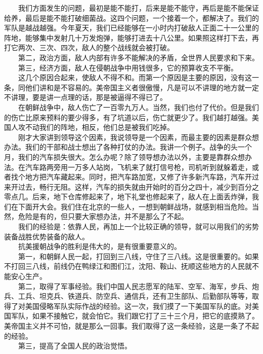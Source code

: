 \documentclass[cn,11pt,chinese]{elegantbook}
\begin{document}
　　我们方面发生的问题，最初是能不能打，后来是能不能守，再后是能不能保证给养，最后是能不能打破细菌战。这四个问题，一个接着一个，都解决了。我们的军队是越战越强。今年夏天，我们已经能够在一小时内打破敌人正面二十一公里的阵地，能够集中发射几十万发炮弹，能够打进去十八公里。如果照这样打下去，再打它两次、三次、四次，敌人的整个战线就会被打破。\\
　　第二，政治方面，敌人内部有许多不能解决的矛盾，全世界人民要求和下来。\\
　　第三，经济方面，敌人在侵朝战争中用钱很多，它的预算收支不平衡。\\
　　这几个原因合起来，使敌人不得不和。而第一个原因是主要的原因，没有这一条，同他们讲和是不容易的。美帝国主义者很傲慢，凡是可以不讲理的地方就一定不讲理，要是讲一点理的话，那是被逼得不得已了。\\
　　在朝鲜战争中，敌人伤亡了一百零九万人。当然，我们也付了代价。但是我们的伤亡比原来预料的要少得多，有了坑道以后，伤亡就更少了。我们越打越强。美国人攻不动我们的阵地，相反，他们总是被我们吃掉。\\
　　刚才大家讲到领导这个因素，我说领导是一个因素，而最主要的因素是群众想办法。我们的干部和战士想出了各种打仗的办法。我讲一个例子。战争的头一个月，我们的汽车损失很大。怎么办呢？除了领导想办法以外，主要是靠群众想办法。在汽车路两旁用一万多人站岗，飞机来了就打信号枪，司机听到就躲着走，或者找个地方把汽车藏起来。同时，把汽车路加宽，又修了许多新汽车路，汽车开过来开过去，畅行无阻。这样，汽车的损失就由开始时的百分之四十，减少到百分之零点几。后来，地下仓库修起来了，地下礼堂也修起来了，敌人在上面丢炸弹，我们在下面开大会。我们住在北京的一些人，一想到朝鲜战场，就感到相当危险。当然，危险是有的，但只要大家想办法，并不是那么了不起。\\
　　我们的经验是：依靠人民，再加上一个比较正确的领导，就可以用我们的劣势装备战胜优势装备的敌人。\\
　　抗美援朝战争的胜利是伟大的，是有很重要意义的。\\
　　第一，和朝鲜人民一起，打回到三八线，守住了三八线。这是很重要的。如果不打回三八线，前线仍在鸭绿江和图们江，沈阳、鞍山、抚顺这些地方的人民就不能安心生产。\\
　　第二，取得了军事经验。我们中国人民志愿军的陆军、空军、海军，步兵、炮兵、工兵、坦克兵、铁道兵、防空兵、通信兵，还有卫生部队、后勤部队等等，取得了对美国侵略军队实际作战的经验。这一次，我们摸了一下美国军队的底。对美国军队，如果不接触它，就会怕它。我们跟它打了三十三个月，把它的底摸熟了。美帝国主义并不可怕，就是那么一回事。我们取得了这一条经验，这是一条了不起的经验。\\
　　第三，提高了全国人民的政治觉悟。\\
\end{document}
